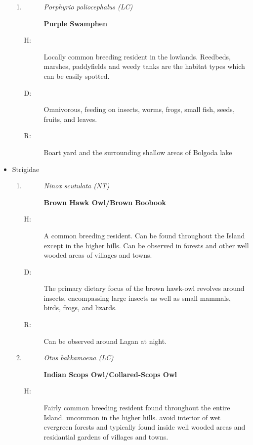 \begin{itemize}
\begin{enumerate}
\item%
\begin{description}%
\item[]%
\textit{Porphyrio poliocephalus (LC)}%
\item[]%
\textbf{Purple Swamphen}%
\end{description}%
\begin{description}%
\item[H: ]%
Locally common breeding resident in the lowlands. Reedbeds, marshes, paddyfields and weedy tanks are the habitat types which can be easily spotted.%
\item[D: ]%
 Omnivorous, feeding on insects, worms, frogs, small fish, seeds, fruits, and leaves.%
\item[R: ]%
Boart yard and the surrounding shallow areas of Bolgoda lake%
\end{description}%
\end{enumerate}%
\item%
Strigidae%
\begin{enumerate}%
\item%
\begin{description}%
\item[]%
\textit{Ninox scutulata (NT)}%
\item[]%
\textbf{Brown Hawk Owl/Brown Boobook}%
\end{description}%
\begin{description}%
\item[H: ]%
A common breeding resident. Can be found throughout the Island except in the higher hills. Can be observed in forests and other well wooded areas of villages and towns. %
\item[D: ]%
The primary dietary focus of the brown hawk{-}owl revolves around insects, encompassing large insects as well as small mammals, birds, frogs, and lizards.%
\item[R: ]%
Can be observed around Lagan at night.%
\end{description}%
\item%
\begin{description}%
\item[]%
\textit{Otus bakkamoena (LC)}%
\item[]%
\textbf{Indian Scops Owl/Collared{-}Scops Owl}%
\end{description}%
\begin{description}%
\item[H: ]%
Fairly common breeding resident found throughout the entire Island. uncommon in the higher hills. avoid interior of wet evergreen forests and typically found inside well wooded areas and residantial gardens of villages and towns.%

\end{description}
\end{enumerate}
\end{itemize}

